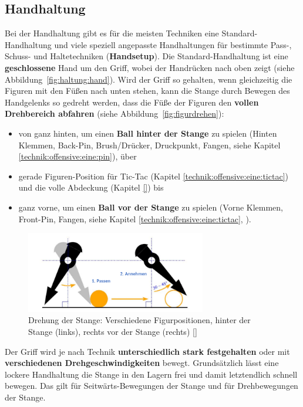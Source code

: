 \subsection{Handhaltung}
\label{technik:haltung:griffe}

Bei der Handhaltung gibt es für die meisten Techniken eine Standard-Handhaltung und viele speziell angepasste Handhaltungen für bestimmte Pass-, Schuss- und Haltetechniken (\textbf{Handsetup}). 
Die Standard-Handhaltung ist eine \textbf{geschlossene} Hand um den Griff, 
wobei der Handrücken nach oben zeigt (siehe Abbildung~\ref{fig:haltung:hand}).
Wird der Griff so gehalten, wenn gleichzeitig die Figuren mit den Füßen nach unten stehen, kann die Stange durch Bewegen des Handgelenks so gedreht werden, dass die Füße der Figuren den \textbf{vollen Drehbereich abfahren} (siehe Abbildung~\ref{fig:figurdrehen}):
\begin{itemize}
    \item von ganz hinten, um einen \textbf{Ball hinter der Stange} zu spielen (Hinten Klemmen, Back-Pin, Brush/Drücker, Druckpunkt, Fangen, siehe Kapitel \ref{technik:offensive:eine:pin}), über
\label{technik:offensive:eine:tictac}
    \item gerade Figuren-Position für Tic-Tac (Kapitel \ref{technik:offensive:eine:tictac}) und die volle Abdeckung (Kapitel \ref{}) bis 
    \item ganz vorne, um einen \textbf{Ball vor der Stange} zu spielen (Vorne Klemmen, Front-Pin, Fangen, siehe Kapitel \ref{technik:offensive:eine:tictac}, ).
\end{itemize}

\begin{figure}
    \centering 
        \includegraphics[width=0.7\textwidth]{img/haltung_figur.png} 
        \caption{Drehung der Stange: Verschiedene Figurpositionen, hinter der Stange (links), rechts vor der Stange (rechts) [\cite{itsf_basics}]} 
        \label{fig:haltung:figur} 
\end{figure}

Der Griff wird je nach Technik \textbf{unterschiedlich stark festgehalten} oder mit \textbf{verschiedenen Drehgeschwindigkeiten} bewegt.
Grundsätzlich lässt eine lockere Handhaltung die Stange in den Lagern frei und damit letztendlich schnell bewegen.
Das gilt für Seitwärts-Bewegungen der Stange und für Drehbewegungen der Stange.

